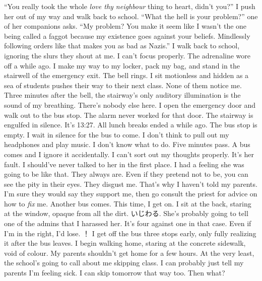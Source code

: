 \documentclass[a4paper, 12pt]{book}
\begin{document}
\begin{CJK*}{UTF8}{min}
\tab
``You really took the whole \textit{love thy neighbour} thing to heart, didn’t you?'' I push her out of my way and walk back to school. 
\newline
\tab
``What the hell is your problem?'' one of her companions asks.
\newline
\tab
``My problem? You make it seem like I wasn’t the one being called a faggot because my existence goes against your beliefs. Mindlessly following orders like that makes you as bad as Nazis.'' I walk back to school, ignoring the slurs they shout at me. I can’t focus properly. The adrenaline wore off a while ago. I make my way to my locker, pack my bag, and stand in the stairwell of the emergency exit. The bell rings. I sit motionless and hidden as a sea of students pushes their way to their next class. None of them notice me. Three minutes after the bell, the stairway’s only auditory illumination is the sound of my breathing. There’s nobody else here. I open the emergency door and walk out to the bus stop. The alarm never worked for that door. The stairway is engulfed in silence. It’s 13:27. All lunch breaks ended a while ago. The bus stop is empty. I wait in silence for the bus to come. I don’t think to pull out my headphones and play music. I don’t know what to do.
\newline
\tab
Five minutes pass. A bus comes and I ignore it accidentally. I can’t sort out my thoughts properly. It’s her fault. I should’ve never talked to her in the first place. I had a feeling she was going to be like that. They always are. Even if they pretend not to be, you can see the pity in their eyes. They disgust me. That’s why I haven’t told my parents. I’m sure they would say they support me, then go consult the priest for advice on how to \textit{fix} me. 
\newline
\tab
Another bus comes. This time, I get on. I sit at the back, staring at the window, opaque from all the dirt. いじわる. She’s probably going to tell one of the admins that I harassed her. It’s four against one in that case. Even if I’m in the right, I’d lose. ！
\newline
\tab
I get off the bus three stops early, only fully realizing it after the bus leaves. I begin walking home, staring at the concrete sidewalk, void of colour. My parents shouldn’t get home for a few hours. At the very least, the school’s going to call about me skipping class. I can probably just tell my parents I’m feeling sick. I can skip tomorrow that way too. Then what?
\newline

\end{CJK*}
\end{document}
